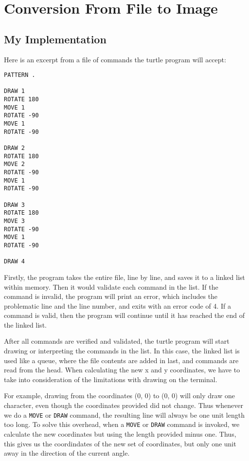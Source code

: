 \documentclass[a4paper, 12pt, titlepage]{article}
\newcommand{\code}[1]{\small\texttt{#1}\normalsize}
\begin{document}
\section{Conversion From File to Image}

\subsection{My Implementation}

Here is an excerpt from a file of commands the turtle program will accept:

\begin{lstlisting}
PATTERN .

DRAW 1
ROTATE 180
MOVE 1
ROTATE -90
MOVE 1
ROTATE -90

DRAW 2
ROTATE 180
MOVE 2
ROTATE -90
MOVE 1
ROTATE -90

DRAW 3
ROTATE 180
MOVE 3
ROTATE -90
MOVE 1
ROTATE -90

DRAW 4
\end{lstlisting}

Firstly, the program takes the entire file, line by line, and saves it to 
a linked list within memory. Then it would validate each command in the list. 
If the command is invalid, the program will print an error, which includes 
the problematic line and the line number, and exits with an error code of 4. 
If a command is valid, then the program will continue until it has reached 
the end of the linked list.

After all commands are verified and validated, the turtle program will start 
drawing or interpreting the commands in the list. In this case, the linked 
list is used like a queue, where the file contents are added in last, and 
commands are read from the head. When calculating the new x and y coordinates, 
we have to take into consideration of the limitations with drawing on the 
terminal.

For example, drawing from the coordinates (0, 0) to (0, 0) will only draw 
one character, even though the coordinates provided did not change. 
Thus whenever we do a \code{MOVE} or \code{DRAW} command, the resulting 
line will always be one unit length too long. To solve this overhead, 
when a \code{MOVE} or \code{DRAW} command is invoked, we calculate the 
new coordinates but using the length provided minus one. Thus, this gives 
us the coordindates of the new set of coordinates, but only one unit away 
in the direction of the current angle.
\end{document}
